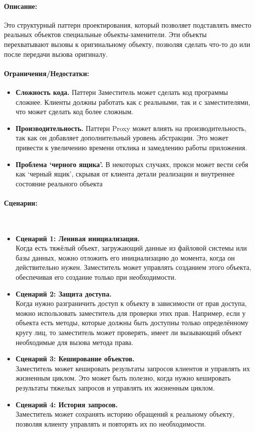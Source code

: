 \documentclass[12pt,onecolumn]{article}
\newcommand{\nparagraph}[1]{\paragraph{#1}\mbox{}\\}
\begin{document}
\paragraph{Описание:} Это структурный паттерн проектирования, который позволяет подставлять вместо реальных объектов специальные объекты-заменители. Эти объекты перехватывают вызовы к оригинальному объекту, позволяя сделать что-то до или после передачи вызова оригиналу.
\paragraph{Ограничения/Недостатки:}
\begin{itemize}
  \item \textbf{Сложность кода.} Паттерн Заместитель может сделать код программы сложнее. Клиенты должны работать как с реальными, так и с заместителями, что может сделать код более сложным.
  \item \textbf{Производительность.} Паттерн Proxy может влиять на производительность, так как он добавляет дополнительный уровень абстракции. Это может привести к увеличению времени отклика и замедлению работы приложения.
  \item \textbf{Проблема ‘черного ящика’.} В некоторых случаях, прокси может вести себя как ‘черный ящик’, скрывая от клиента детали реализации и внутреннее состояние реального объекта
\end{itemize}
\nparagraph{Сценарии:}
\begin{itemize}
  \item{
    \textbf{Сценарий 1: Ленивая инициализация.} \\
    Когда есть тяжёлый объект, загружающий данные из файловой системы или базы данных, можно отложить его инициализацию до момента, когда он действительно нужен. Заместитель может управлять созданием этого объекта, обеспечивая его создание только при необходимости.
  }
  \item{
    \textbf{Сценарий 2: Защита доступа.} \\
    Когда нужно разграничить доступ к объекту в зависимости от прав доступа, можно использовать заместитель для проверки этих прав. Например, если у объекта есть методы, которые должны быть доступны только определённому кругу лиц, то заместитель может проверять, имеет ли вызывающий объект необходимые для вызова метода права.
  }
  \item {
    \textbf{Сценарий 3: Кеширование объектов.} \\
    Заместитель может кешировать результаты запросов клиентов и управлять их жизненным циклом. Это может быть полезно, когда нужно кешировать результаты тяжелых запросов и управлять их жизненным циклом.
  }
  \item {
    \textbf{Сценарий 4: История запросов.} \\
    Заместитель может сохранять историю обращений к реальному объекту, позволяя клиенту управлять и повторять их по необходимости.
  }
\end{itemize}
\end{document}
